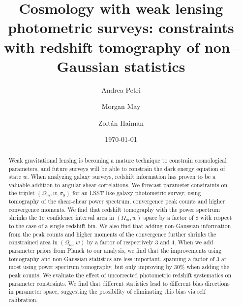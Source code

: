 \documentclass[reprint,aps,prd,superscriptaddress,showkeys,showpacs]{revtex4-1}
\begin{document}
\title{Cosmology with weak lensing photometric surveys: constraints with redshift tomography of non--Gaussian statistics}

\author{Andrea Petri}

\author{Morgan May}

\author{Zolt\'an Haiman}

\date{\today}

\label{firstpage}

\begin{abstract}
Weak gravitational lensing is becoming a mature technique to constrain cosmological parameters, and future surveys will be able to constrain the dark energy equation of state $w$. When analyzing galaxy surveys, redshift information has proven to be a valuable addition to angular shear correlations. We forecast parameter constraints on the triplet $(\Omega_m,w,\sigma_8)$ for an LSST like galaxy photometric survey, using tomography of the shear-shear power spectrum, convergence peak counts and higher convergence moments. We find that redshift tomography with the power spectrum shrinks the $1\sigma$ confidence interval area in $(\Omega_m,w)$ space by a factor of 8 with respect to the case of a single redshift bin. We also find that adding non-Gaussian information from the peak counts and higher moments of the convergence further shrinks the constrained area in $(\Omega_m,w)$ by a factor of respectively 3 and 4. When we add parameter priors from Planck to our analysis, we find that the improvements using tomography and non-Gaussian statistics are less important, spanning a factor of 3 at most using power spectrum tomography, but only improving by 30\% when adding the peak counts. 
We evaluate the effect of uncorrected photometric redshift systematics on parameter constraints. We find that different statistics lead to different bias directions in parameter space, suggesting the possibility of eliminating this bias via self--calibration. 
\end{abstract}


\end{document}
